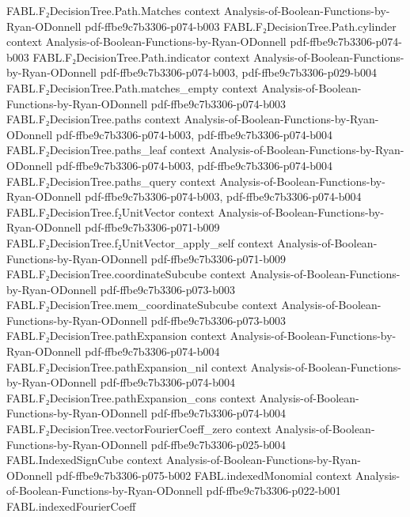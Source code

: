 \begin{theorem}
\proofstep
  {FABL.F₂DecisionTree.Path.Matches}
  {context}
  {Analysis-of-Boolean-Functions-by-Ryan-ODonnell}
  {pdf-ffbe9c7b3306-p074-b003}
\proofstep
  {FABL.F₂DecisionTree.Path.cylinder}
  {context}
  {Analysis-of-Boolean-Functions-by-Ryan-ODonnell}
  {pdf-ffbe9c7b3306-p074-b003}
\proofstep
  {FABL.F₂DecisionTree.Path.indicator}
  {context}
  {Analysis-of-Boolean-Functions-by-Ryan-ODonnell}
  {pdf-ffbe9c7b3306-p074-b003,
    pdf-ffbe9c7b3306-p029-b004}
\proofstep
  {FABL.F₂DecisionTree.Path.matches_empty}
  {context}
  {Analysis-of-Boolean-Functions-by-Ryan-ODonnell}
  {pdf-ffbe9c7b3306-p074-b003}
\proofstep
  {FABL.F₂DecisionTree.paths}
  {context}
  {Analysis-of-Boolean-Functions-by-Ryan-ODonnell}
  {pdf-ffbe9c7b3306-p074-b003,
    pdf-ffbe9c7b3306-p074-b004}
\proofstep
  {FABL.F₂DecisionTree.paths_leaf}
  {context}
  {Analysis-of-Boolean-Functions-by-Ryan-ODonnell}
  {pdf-ffbe9c7b3306-p074-b003,
    pdf-ffbe9c7b3306-p074-b004}
\proofstep
  {FABL.F₂DecisionTree.paths_query}
  {context}
  {Analysis-of-Boolean-Functions-by-Ryan-ODonnell}
  {pdf-ffbe9c7b3306-p074-b003,
    pdf-ffbe9c7b3306-p074-b004}
\proofstep
  {FABL.F₂DecisionTree.f₂UnitVector}
  {context}
  {Analysis-of-Boolean-Functions-by-Ryan-ODonnell}
  {pdf-ffbe9c7b3306-p071-b009}
\proofstep
  {FABL.F₂DecisionTree.f₂UnitVector_apply_self}
  {context}
  {Analysis-of-Boolean-Functions-by-Ryan-ODonnell}
  {pdf-ffbe9c7b3306-p071-b009}
\proofstep
  {FABL.F₂DecisionTree.coordinateSubcube}
  {context}
  {Analysis-of-Boolean-Functions-by-Ryan-ODonnell}
  {pdf-ffbe9c7b3306-p073-b003}
\proofstep
  {FABL.F₂DecisionTree.mem_coordinateSubcube}
  {context}
  {Analysis-of-Boolean-Functions-by-Ryan-ODonnell}
  {pdf-ffbe9c7b3306-p073-b003}
\proofstep
  {FABL.F₂DecisionTree.pathExpansion}
  {context}
  {Analysis-of-Boolean-Functions-by-Ryan-ODonnell}
  {pdf-ffbe9c7b3306-p074-b004}
\proofstep
  {FABL.F₂DecisionTree.pathExpansion_nil}
  {context}
  {Analysis-of-Boolean-Functions-by-Ryan-ODonnell}
  {pdf-ffbe9c7b3306-p074-b004}
\proofstep
  {FABL.F₂DecisionTree.pathExpansion_cons}
  {context}
  {Analysis-of-Boolean-Functions-by-Ryan-ODonnell}
  {pdf-ffbe9c7b3306-p074-b004}
\proofstep
  {FABL.F₂DecisionTree.vectorFourierCoeff_zero}
  {context}
  {Analysis-of-Boolean-Functions-by-Ryan-ODonnell}
  {pdf-ffbe9c7b3306-p025-b004}
\proofstep
  {FABL.IndexedSignCube}
  {context}
  {Analysis-of-Boolean-Functions-by-Ryan-ODonnell}
  {pdf-ffbe9c7b3306-p075-b002}
\proofstep
  {FABL.indexedMonomial}
  {context}
  {Analysis-of-Boolean-Functions-by-Ryan-ODonnell}
  {pdf-ffbe9c7b3306-p022-b001}
\proofstep
  {FABL.indexedFourierCoeff}

\end{theorem}
